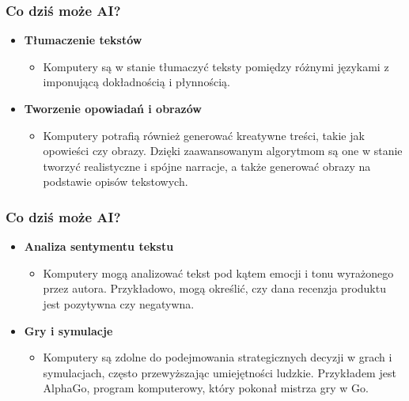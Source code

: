 \documentclass{beamer}
\begin{document}
\begin{frame}[fragile]
\frametitle{Co dziś może AI?}
\begin{itemize}
\item \textbf{Tłumaczenie tekstów}
	\begin{itemize}
	\item Komputery są w stanie tłumaczyć teksty pomiędzy różnymi językami z imponującą dokładnością i płynnością.
	\end{itemize}
\item \textbf{Tworzenie opowiadań i obrazów} 
	\begin{itemize}
	\item Komputery potrafią również generować kreatywne treści, takie jak opowieści czy obrazy. Dzięki zaawansowanym algorytmom są one w stanie tworzyć realistyczne i spójne narracje, a także generować obrazy na podstawie opisów tekstowych.
	\end{itemize}
\end{itemize}
\end{frame}

\begin{frame}[fragile]
\frametitle{Co dziś może AI?}
\begin{itemize}
\item \textbf{Analiza sentymentu tekstu}
	\begin{itemize}
	\item Komputery mogą analizować tekst pod kątem emocji i tonu wyrażonego przez autora. Przykładowo, mogą określić, czy dana recenzja produktu jest pozytywna czy negatywna.
	\end{itemize}
\item \textbf{Gry i symulacje} 
	\begin{itemize}
	\item Komputery są zdolne do podejmowania strategicznych decyzji w grach i symulacjach, często przewyższając umiejętności ludzkie. Przykładem jest AlphaGo, program komputerowy, który pokonał mistrza gry w Go.
	\end{itemize}
\end{itemize}
\end{frame}
\end{document}
